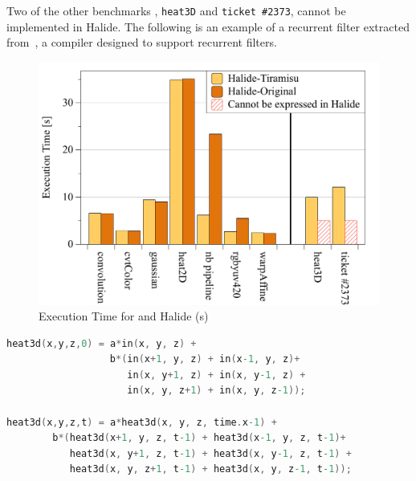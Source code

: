 Two of the other benchmarks , \texttt{heat3D} and \texttt{ticket \#2373}, cannot be implemented in Halide.  The following is an example of a recurrent filter extracted from~\cite{recfilter}, a compiler designed to support recurrent filters.

\begin{figure}
\centering
 \includegraphics[width=0.8\columnwidth]{./figures/tiramisu_vs_halide.pdf}
 \caption{Execution Time for \framework and Halide (s)}
 \label{fig:speedup}
 \vspace{-0.5cm}
\end{figure}

\begin{lstlisting}[language=C,escapechar=@,numbers=none]
heat3d(x,y,z,0) = a*in(x, y, z) +
                  b*(in(x+1, y, z) + in(x-1, y, z)+
                     in(x, y+1, z) + in(x, y-1, z) +
                     in(x, y, z+1) + in(x, y, z-1));

heat3d(x,y,z,t) = a*heat3d(x, y, z, time.x-1) +
        b*(heat3d(x+1, y, z, t-1) + heat3d(x-1, y, z, t-1)+
           heat3d(x, y+1, z, t-1) + heat3d(x, y-1, z, t-1) +
           heat3d(x, y, z+1, t-1) + heat3d(x, y, z-1, t-1));
\end{lstlisting}

